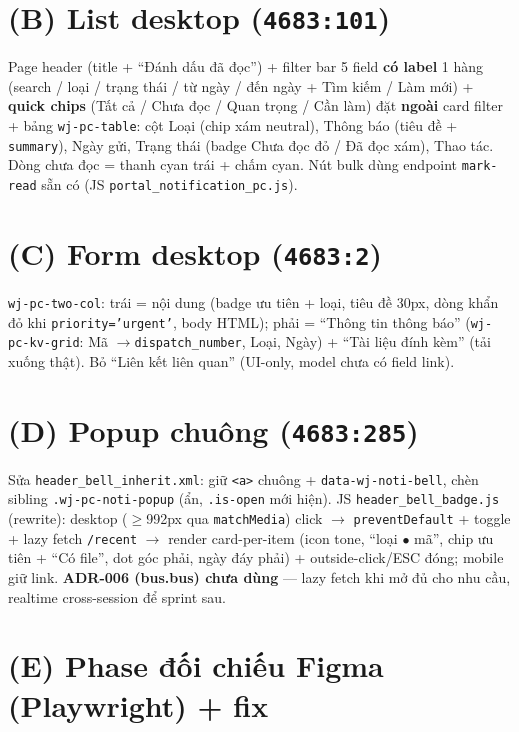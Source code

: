 \section{(B) List desktop (\texttt{4683:101})}

Page header (title + ``Đánh dấu đã đọc'') + filter bar 5 field \textbf{có label} 1 hàng (search /
loại / trạng thái / từ ngày / đến ngày + Tìm kiếm / Làm mới) + \textbf{quick chips} (Tất cả / Chưa đọc /
Quan trọng / Cần làm) đặt \textbf{ngoài} card filter + bảng \texttt{wj-pc-table}: cột Loại (chip xám
neutral), Thông báo (tiêu đề + \texttt{summary}), Ngày gửi, Trạng thái (badge Chưa đọc đỏ / Đã đọc xám),
Thao tác. Dòng chưa đọc = thanh cyan trái + chấm cyan. Nút bulk dùng endpoint \texttt{mark-read} sẵn có
(JS \texttt{portal\_notification\_pc.js}).

\section{(C) Form desktop (\texttt{4683:2})}

\texttt{wj-pc-two-col}: trái = nội dung (badge ưu tiên + loại, tiêu đề 30px, dòng khẩn đỏ khi
\texttt{priority='urgent'}, body HTML); phải = ``Thông tin thông báo'' (\texttt{wj-pc-kv-grid}: Mã
$\rightarrow$\texttt{dispatch\_number}, Loại, Ngày) + ``Tài liệu đính kèm'' (tải xuống thật). Bỏ
``Liên kết liên quan'' (UI-only, model chưa có field link).

\section{(D) Popup chuông (\texttt{4683:285})}

Sửa \texttt{header\_bell\_inherit.xml}: giữ \texttt{<a>} chuông + \texttt{data-wj-noti-bell}, chèn
sibling \texttt{.wj-pc-noti-popup} (ẩn, \texttt{.is-open} mới hiện). JS \texttt{header\_bell\_badge.js}
(rewrite): desktop ($\geq$992px qua \texttt{matchMedia}) click $\rightarrow$ \texttt{preventDefault} +
toggle + lazy fetch \texttt{/recent} $\rightarrow$ render card-per-item (icon tone, ``loại $\bullet$ mã'',
chip ưu tiên + ``Có file'', dot góc phải, ngày đáy phải) + outside-click/ESC đóng; mobile giữ link.
\textbf{ADR-006 (bus.bus) chưa dùng} --- lazy fetch khi mở đủ cho nhu cầu, realtime cross-session để
sprint sau.

\section{(E) Phase đối chiếu Figma (Playwright) + fix}

